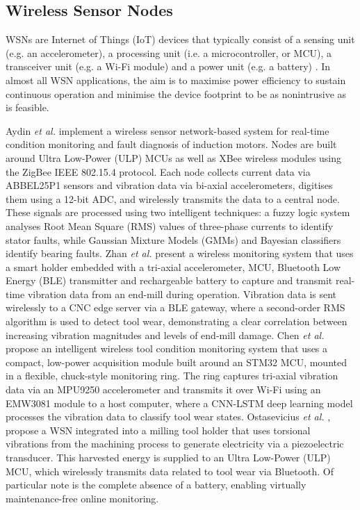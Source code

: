 \documentclass[../main.tex]{subfiles}
\begin{document}

\subsection{Wireless Sensor Nodes}

WSNs are Internet of Things (IoT) devices that typically consist of a sensing unit (e.g. an accelerometer), a processing unit (i.e. a microcontroller, or MCU), a transceiver unit (e.g. a Wi-Fi module) and a power unit (e.g. a battery) \cite{KEERTHANA2020145}. In almost all WSN applications, the aim is to maximise power efficiency to sustain continuous operation and minimise the device footprint to be as nonintrusive as is feasible. 

Aydin \textit{et al.} \cite{RN31} implement a wireless sensor network-based system for real-time condition monitoring and fault diagnosis of induction motors. Nodes are built around Ultra Low-Power (ULP) MCUs as well as XBee wireless modules using the ZigBee IEEE 802.15.4 protocol. Each node collects current data via ABBEL25P1 sensors and vibration data via bi-axial accelerometers, digitises them using a 12-bit ADC, and wirelessly transmits the data to a central node. These signals are processed using two intelligent techniques: a fuzzy logic system analyses Root Mean Square (RMS) values of three-phase currents to identify stator faults, while Gaussian Mixture Models (GMMs) and Bayesian classifiers identify bearing faults. Zhan \textit{et al.} \cite{RN32} present a wireless monitoring system that uses a smart holder embedded with a tri-axial accelerometer, MCU, Bluetooth Low Energy (BLE) transmitter and rechargeable battery to capture and transmit real-time vibration data from an end-mill during operation. Vibration data is sent wirelessly to a CNC edge server via a BLE gateway, where a second-order RMS algorithm is used to detect tool wear, demonstrating a clear correlation between increasing vibration magnitudes and levels of end-mill damage. Chen \textit{et al.} \cite{RN33} propose an intelligent wireless tool condition monitoring system that uses a compact, low-power acquisition module built around an STM32 MCU, mounted in a flexible, chuck-style monitoring ring. The ring captures tri-axial vibration data via an MPU9250 accelerometer and transmits it over Wi-Fi using an EMW3081 module to a host computer, where a CNN-LSTM deep learning model processes the vibration data to classify tool wear states. Ostasevicius \textit{et al.} \cite{RN28}, \cite{RN30} propose a WSN integrated into a milling tool holder that uses torsional vibrations from the machining process to generate electricity via a piezoelectric transducer. This harvested energy is supplied to an Ultra Low-Power (ULP) MCU, which wirelessly transmits data related to tool wear via Bluetooth. Of particular note is the complete absence of a battery, enabling virtually maintenance-free online monitoring.
\end{document}
